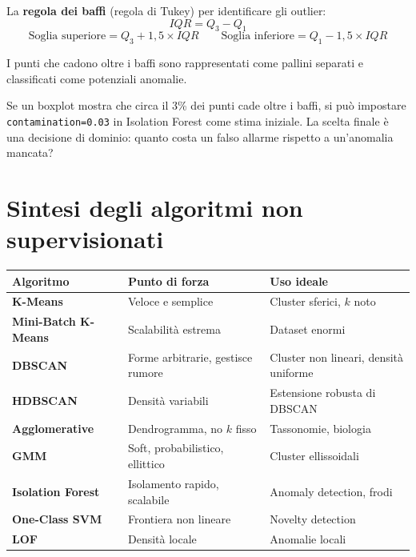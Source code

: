 La \textbf{regola dei baffi} (regola di Tukey) per identificare gli outlier:
\[
IQR = Q_3 - Q_1
\]
\[
\text{Soglia superiore} = Q_3 + 1{,}5 \times IQR
\qquad
\text{Soglia inferiore} = Q_1 - 1{,}5 \times IQR
\]

I punti che cadono oltre i baffi sono rappresentati come pallini separati e classificati come potenziali anomalie.

\begin{exbox}
Se un boxplot mostra che circa il 3\% dei punti cade oltre i baffi, si può impostare \texttt{contamination=0.03} in Isolation Forest come stima iniziale. La scelta finale è una decisione di dominio: quanto costa un falso allarme rispetto a un'anomalia mancata?
\end{exbox}

\section{Sintesi degli algoritmi non supervisionati}

\begin{center}
\renewcommand{\arraystretch}{1.4}
\begin{tabular}{@{} l p{4.2cm} p{5.6cm} @{}}
\toprule
\textbf{Algoritmo} & \textbf{Punto di forza} & \textbf{Uso ideale} \\
\midrule
\textbf{K-Means} & Veloce e semplice & Cluster sferici, $k$ noto \\
\textbf{Mini-Batch K-Means} & Scalabilità estrema & Dataset enormi \\
\textbf{DBSCAN} & Forme arbitrarie, gestisce rumore & Cluster non lineari, densità uniforme \\
\textbf{HDBSCAN} & Densità variabili & Estensione robusta di DBSCAN \\
\textbf{Agglomerative} & Dendrogramma, no $k$ fisso & Tassonomie, biologia \\
\textbf{GMM} & Soft, probabilistico, ellittico & Cluster ellissoidali \\
\textbf{Isolation Forest} & Isolamento rapido, scalabile & Anomaly detection, frodi \\
\textbf{One-Class SVM} & Frontiera non lineare & Novelty detection \\
\textbf{LOF} & Densità locale & Anomalie locali \\
\bottomrule
\end{tabular}
\end{center}

